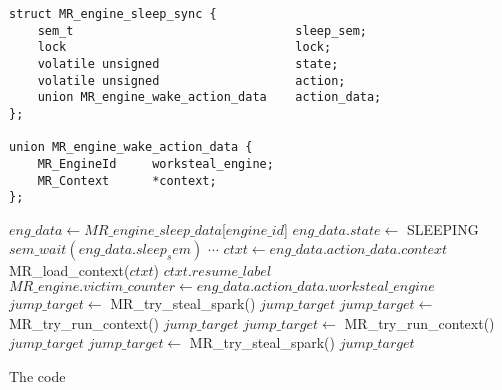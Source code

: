 \begin{algorithm}[tbp]
\begin{minipage}{\textwidth}
\begin{verbatim}
struct MR_engine_sleep_sync {
    sem_t                               sleep_sem;
    lock                                lock;
    volatile unsigned                   state;
    volatile unsigned                   action;
    union MR_engine_wake_action_data    action_data;
};

union MR_engine_wake_action_data {      
    MR_EngineId     worksteal_engine;
    MR_Context      *context;
};
\end{verbatim}

\begin{algorithmic}
        \Loop
            \State $eng\_data \gets MR\_engine\_sleep\_data$[$engine\_id$]
            \State $eng\_data.state \gets$ SLEEPING
            \State $sem\_wait(eng\_data.sleep_sem)$
                \State $\cdots$
              \EndCase
                \State $ctxt \gets eng\_data.action\_data.context$
                \State MR\_load\_context($ctxt$)
                \Goto $ctxt.resume\_label$
              \EndCase
                \State $MR\_engine.victim\_counter \gets
                    eng\_data.action\_data.worksteal\_engine$ 
                \State $jump\_target \gets$ MR\_try\_steal\_spark()
                    \Goto $jump\_target$
                \EndIf
                \State $jump\_target \gets$ MR\_try\_run\_context()
                    \Goto $jump\_target$
                \EndIf
                \State \Break
              \EndCase
                \State $jump\_target \gets$ MR\_try\_run\_context()
                    \Goto $jump\_target$
                \EndIf
                \State $jump\_target \gets$ MR\_try\_steal\_spark()
                    \Goto $jump\_target$
                \EndIf
                \State \Break
              \EndCase
            \EndSwitch
        \EndLoop
    \EndProcedure
\end{algorithmic}

\end{minipage}
\caption{The \sleep code}
\end{algorithm}

